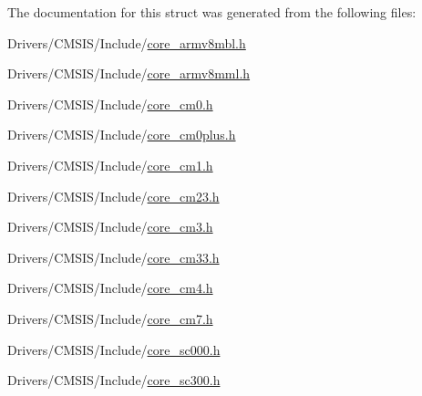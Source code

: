 The documentation for this struct was generated from the following files\+:\begin{DoxyCompactItemize}
\item 
Drivers/\+C\+M\+S\+I\+S/\+Include/\hyperlink{core__armv8mbl_8h}{core\+\_\+armv8mbl.\+h}\item 
Drivers/\+C\+M\+S\+I\+S/\+Include/\hyperlink{core__armv8mml_8h}{core\+\_\+armv8mml.\+h}\item 
Drivers/\+C\+M\+S\+I\+S/\+Include/\hyperlink{core__cm0_8h}{core\+\_\+cm0.\+h}\item 
Drivers/\+C\+M\+S\+I\+S/\+Include/\hyperlink{core__cm0plus_8h}{core\+\_\+cm0plus.\+h}\item 
Drivers/\+C\+M\+S\+I\+S/\+Include/\hyperlink{core__cm1_8h}{core\+\_\+cm1.\+h}\item 
Drivers/\+C\+M\+S\+I\+S/\+Include/\hyperlink{core__cm23_8h}{core\+\_\+cm23.\+h}\item 
Drivers/\+C\+M\+S\+I\+S/\+Include/\hyperlink{core__cm3_8h}{core\+\_\+cm3.\+h}\item 
Drivers/\+C\+M\+S\+I\+S/\+Include/\hyperlink{core__cm33_8h}{core\+\_\+cm33.\+h}\item 
Drivers/\+C\+M\+S\+I\+S/\+Include/\hyperlink{core__cm4_8h}{core\+\_\+cm4.\+h}\item 
Drivers/\+C\+M\+S\+I\+S/\+Include/\hyperlink{core__cm7_8h}{core\+\_\+cm7.\+h}\item 
Drivers/\+C\+M\+S\+I\+S/\+Include/\hyperlink{core__sc000_8h}{core\+\_\+sc000.\+h}\item 
Drivers/\+C\+M\+S\+I\+S/\+Include/\hyperlink{core__sc300_8h}{core\+\_\+sc300.\+h}\end{DoxyCompactItemize}
